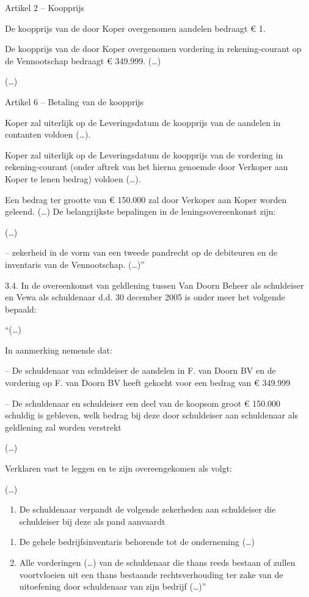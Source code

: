 \documentclass[
  dutch,
  a4paper,
]{article}
\providecommand{\tightlist}{%
  \setlength{\itemsep}{0pt}\setlength{\parskip}{0pt}}
\begin{document}
Artikel 2 -- Koopprijs

De koopprijs van de door Koper overgenomen aandelen bedraagt € 1.

De koopprijs van de door Koper overgenomen vordering in rekening-courant op de Vennootschap bedraagt € 349.999. (\ldots)

(\ldots)

Artikel 6 -- Betaling van de koopprijs

Koper zal uiterlijk op de Leveringsdatum de koopprijs van de aandelen in contanten voldoen (\ldots).

Koper zal uiterlijk op de Leveringsdatum de koopprijs van de vordering in rekening-courant (onder aftrek van het hierna genoemde door Verkoper aan Koper te lenen bedrag) voldoen (\ldots).

Een bedrag ter grootte van € 150.000 zal door Verkoper aan Koper worden geleend. (\ldots) De belangrijkste bepalingen in de leningsovereenkomst zijn:

(\ldots)

-- zekerheid in de vorm van een tweede pandrecht op de debiteuren en de inventaris van de Vennootschap. (\ldots)''

3.4. In de overeenkomst van geldlening tussen Van Doorn Beheer als schuldeiser en Vewa als schuldenaar d.d. 30 december 2005 is onder meer het volgende bepaald:

``(\ldots)

In aanmerking nemende dat:

-- De schuldenaar van schuldeiser de aandelen in F. van Doorn BV en de vordering op F. van Doorn BV heeft gekocht voor een bedrag van € 349.999

-- De schuldenaar en schuldeiser een deel van de koopsom groot € 150.000 schuldig is gebleven, welk bedrag bij deze door schuldeiser aan schuldenaar als geldlening zal worden verstrekt

(\ldots)

Verklaren vast te leggen en te zijn overeengekomen als volgt:

(\ldots)

\begin{enumerate}
\def\labelenumi{\arabic{enumi}.}
\setcounter{enumi}{7}
\tightlist
\item
  De schuldenaar verpandt de volgende zekerheden aan schuldeiser die schuldeiser bij deze als pand aanvaardt
\end{enumerate}

\begin{enumerate}
\def\labelenumi{\alph{enumi})}
\item
  De gehele bedrijfsinventaris behorende tot de onderneming (\ldots)
\item
  Alle vorderingen (\ldots) van de schuldenaar die thans reeds bestaan of zullen voortvloeien uit een thans bestaande rechtsverhouding ter zake van de uitoefening door schuldenaar van zijn bedrijf (\ldots)''
\end{enumerate}
\end{document}
